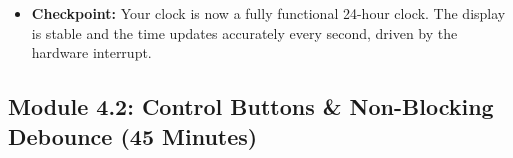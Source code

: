 \documentclass[11pt,a4paper]{article}
\begin{document}
\begin{itemize}
\begin{lstlisting}[caption={Code for Module 4.1: Full Clock Logic}]
// This function contains the core cascading logic.
void update_time() {
  // Check if a second has passed.
  if (deciseconds >= 10) {
    deciseconds = 0; // Reset for the next second
    seconds++;
    if (seconds >= 60) {
      seconds = 0;
      minutes++;
      if (minutes >= 60) {
        minutes = 0;
        hours++;
        if (hours >= 24) {
          hours = 0;
        }
      }
    }
    // After any change, we must update the display array.
    map_time_to_display_array();
  }
}

// ISR remains the same, just increments deciseconds
ISR(TIMER1_COMPA_vect) {
  deciseconds++;
}

void loop() {
  // In the main loop, we constantly check and update the time,
  // and then refresh the display.
  update_time();
  mux_update(); // The multiplexing function from Day 3
}
\end{lstlisting}
    \item \textbf{Checkpoint:} Your clock is now a fully functional 24-hour clock. The display is stable and the time updates accurately every second, driven by the hardware interrupt.
\end{itemize}
\newpage
\subsection*{Module 4.2: Control Buttons \& Non-Blocking Debounce (45 Minutes)}
\end{document}
